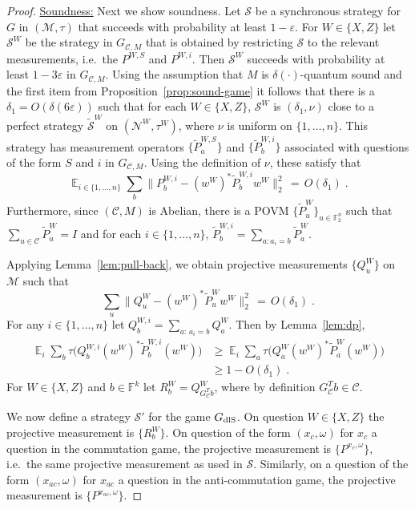 \documentclass[11pt]{article}
\theoremstyle{definition}
\newcommand{\code}{\mathcal{C}}
\newcommand{\strategy}{\mathscr{S}}
\newcommand{\Id}{\ensuremath{I}}
\DeclareMathOperator*{\Expectation}{\mathbb{E}}
\newcommand{\Es}[1]{\Expectation_{#1}}
\newcommand{\field}{\mathbb{F}_2}
\newcommand{\dlS}{\ensuremath{\rm dlS}}
\newcommand{\F}{\ensuremath{\mathbb{F}}}
\newcommand{\mC}{\ensuremath{\mathcal{C}}}
\newcommand{\mM}{\ensuremath{\mathcal{M}}}
\newcommand{\eps}{\varepsilon}
\newcommand{\mN}{\mathcal{N}}
\begin{document}
\begin{proof}
\underline{Soundness:} Next we show soundness. Let $\strategy$ be a synchronous strategy for $G$  in  $(\mM,\tau)$ that succeeds with probability at least $1-\eps$. For $W\in\{X,Z\}$ let $\strategy^W$ be the strategy in $G_{\code,M}$ that is obtained by restricting $\strategy$ to the relevant measurements, i.e.\ the $P^{W,S}$ and $P^{W,i}$.  Then $\strategy^W$ succeeds with probability at least $1-3\eps$ in $G_{\code,M}$. Using the assumption that $M$ is $\delta(\cdot)$-quantum sound and the first item from Proposition~\ref{prop:sound-game} it follows that there is a $\delta_1 = O({\delta(6\eps)})$ such that for each $W\in\{X,Z\}$, $\strategy^W$ is $(\delta_1,\nu)$ close to a perfect strategy $\tilde{\strategy}^W$ on $(\mN^W,\tau^W)$, where $\nu$ is uniform on $\{1,\ldots,n\}$. This strategy has measurement operators $\{ \tilde{P}^{W,S}_a\}$ and $\{\tilde{P}^{W,i}_b\}$ associated with questions of the form $S$ and $i$ in $G_{\code,M}$. Using the definition of $\nu$, these satisfy that 
\begin{equation}\label{eq:main-0}
\Es{i\in\{1,\ldots,n\}}\sum_b \big\|P^{W,i}_b - (w^W)^* \tilde{P}_b^{W,i} w^W \big\|^2_2 \,=\, O(\delta_1)\;.
\end{equation}
Furthermore, since $(\code,M)$ is Abelian, there is a  POVM $\{\tilde{P}^W_u\}_{u\in \field^n}$ such that $\sum_{u\in \code}\tilde{P}^W_u = \Id$ and for each $i\in \{1,\ldots,n\}$, $\tilde{P}^{W,i}_b = \sum_{a:a_i=b} \tilde{P}^W_a$.%
 
Applying Lemma~\ref{lem:pull-back}, we obtain projective measurements $\{Q^W_u\}$ on $\mM$ such that 
\begin{equation}\label{eq:main-1}
\sum_u \big\|Q^W_u - (w^W)^* \tilde{P}_u^W w^W \big\|^2_2 \,=\, O(\delta_1)\;.
\end{equation}
For any $i\in\{1,\ldots,n\}$ let $Q^{W,i}_b = \sum_{a:\,a_i=b}  Q^W_a$. Then by Lemma~\ref{lem:dp},
\begin{align*}
\Es{i}\sum_b \tau\big( Q^{W,i}_b (w^W)^*\tilde{P}^{W,i}_b(w^W) \big)
&\geq \Es{i}\sum_a \tau\big( Q^{W}_a (w^W)^*\tilde{P}^{W}_a(w^W) \big)\\
&\geq 1-O(\delta_1)\;.
\end{align*}
For $W\in\{X,Z\}$ and $b\in \F^k$ let $R^W_b = Q^W_{G_\mC^T b}$, where by definition $G_\mC^T b\in \mC$. 

We now define a strategy $\strategy'$ for the game $G_{\dlS}$. On question $W\in \{X,Z\}$ the projective measurement is $\{R^W_b\}$. On question of the form $(x_c,\omega)$ for $x_c$ a question in the commutation game, the projective measurement is $\{P^{x_c,\omega}\}$, i.e.\ the same projective measurement as used in $\strategy$. Similarly, on a question of the form $(x_{ac},\omega)$ for $x_{ac}$ a question in the anti-commutation game, the projective measurement is $\{P^{x_{ac},\omega}\}$.


\end{proof}
\end{document}
